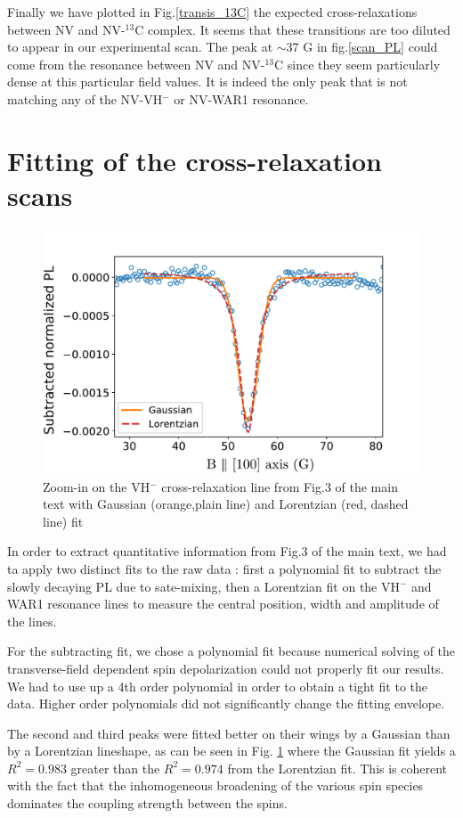 \documentclass[9pt,twocolumn,twoside]{revtex4-1}
\begin{document}
Finally we have plotted in Fig.\ref{transis_13C} the expected cross-relaxations between NV and NV-$^{13}$C complex. It seems that these transitions are too diluted to appear in our experimental scan. The peak at $\sim$37 G in fig.\ref{scan_PL} could come from the resonance between NV and NV-$^{13}$C since they seem particularly dense at this particular field values.
It is indeed  the only peak that is not matching any of the NV-VH$^-$ or NV-WAR1 resonance.

\section{Fitting of the cross-relaxation scans}
\begin{figure}
\includegraphics[scale=0.5]{Gauss_vs_Lor_VH}
\caption{Zoom-in on the VH$^-$ cross-relaxation line from Fig.3 of the main text with Gaussian (orange,plain line) and Lorentzian (red, dashed line) fit}
\label{Gauss_vs_Lor}
\end{figure}
In order to extract quantitative information from Fig.3 of the main text, we had ta apply two distinct fits to the raw data : first a polynomial fit to subtract the slowly decaying PL due to sate-mixing, then a Lorentzian fit on the VH$^-$ and WAR1 resonance lines to measure the central position, width and amplitude of the lines.

For the subtracting fit, we chose a polynomial fit because numerical solving of the transverse-field dependent spin depolarization could not properly fit our results. We had to use up a 4th order polynomial in order to obtain a tight fit to the data. Higher order polynomials did not significantly change the fitting envelope.

The second and third peaks were fitted better on their wings by a Gaussian than by a Lorentzian lineshape, as can be seen in Fig. \ref{Gauss_vs_Lor} where the Gaussian fit yields a $R^2=0.983$ greater than the $R^2=0.974$ from the Lorentzian fit. This is coherent with the fact that the inhomogeneous broadening of the various spin species dominates the coupling strength between the spins.
\end{document}

